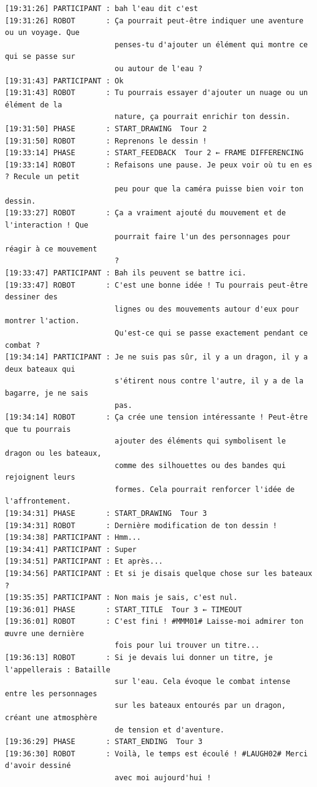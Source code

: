 \documentclass[11pt]{article}
\begin{document}
{\begin{verbatim}
[19:31:26] PARTICIPANT : bah l'eau dit c'est
[19:31:26] ROBOT       : Ça pourrait peut-être indiquer une aventure ou un voyage. Que
                         penses-tu d'ajouter un élément qui montre ce qui se passe sur
                         ou autour de l'eau ?
[19:31:43] PARTICIPANT : Ok
[19:31:43] ROBOT       : Tu pourrais essayer d'ajouter un nuage ou un élément de la
                         nature, ça pourrait enrichir ton dessin.
[19:31:50] PHASE       : START_DRAWING  Tour 2
[19:31:50] ROBOT       : Reprenons le dessin !
[19:33:14] PHASE       : START_FEEDBACK  Tour 2 ← FRAME DIFFERENCING
[19:33:14] ROBOT       : Refaisons une pause. Je peux voir où tu en es ? Recule un petit
                         peu pour que la caméra puisse bien voir ton dessin.
[19:33:27] ROBOT       : Ça a vraiment ajouté du mouvement et de l'interaction ! Que
                         pourrait faire l'un des personnages pour réagir à ce mouvement
                         ?
[19:33:47] PARTICIPANT : Bah ils peuvent se battre ici.
[19:33:47] ROBOT       : C'est une bonne idée ! Tu pourrais peut-être dessiner des
                         lignes ou des mouvements autour d'eux pour montrer l'action.
                         Qu'est-ce qui se passe exactement pendant ce combat ?
[19:34:14] PARTICIPANT : Je ne suis pas sûr, il y a un dragon, il y a deux bateaux qui
                         s'étirent nous contre l'autre, il y a de la bagarre, je ne sais
                         pas.
[19:34:14] ROBOT       : Ça crée une tension intéressante ! Peut-être que tu pourrais
                         ajouter des éléments qui symbolisent le dragon ou les bateaux,
                         comme des silhouettes ou des bandes qui rejoignent leurs
                         formes. Cela pourrait renforcer l'idée de l'affrontement.
[19:34:31] PHASE       : START_DRAWING  Tour 3
[19:34:31] ROBOT       : Dernière modification de ton dessin !
[19:34:38] PARTICIPANT : Hmm...
[19:34:41] PARTICIPANT : Super
[19:34:51] PARTICIPANT : Et après...
[19:34:56] PARTICIPANT : Et si je disais quelque chose sur les bateaux ?
[19:35:35] PARTICIPANT : Non mais je sais, c'est nul.
[19:36:01] PHASE       : START_TITLE  Tour 3 ← TIMEOUT
[19:36:01] ROBOT       : C'est fini ! #MMM01# Laisse-moi admirer ton œuvre une dernière
                         fois pour lui trouver un titre...
[19:36:13] ROBOT       : Si je devais lui donner un titre, je l'appellerais : Bataille
                         sur l'eau. Cela évoque le combat intense entre les personnages
                         sur les bateaux entourés par un dragon, créant une atmosphère
                         de tension et d'aventure.
[19:36:29] PHASE       : START_ENDING  Tour 3
[19:36:30] ROBOT       : Voilà, le temps est écoulé ! #LAUGH02# Merci d'avoir dessiné
                         avec moi aujourd'hui !
\end{verbatim}
}
\end{document}
